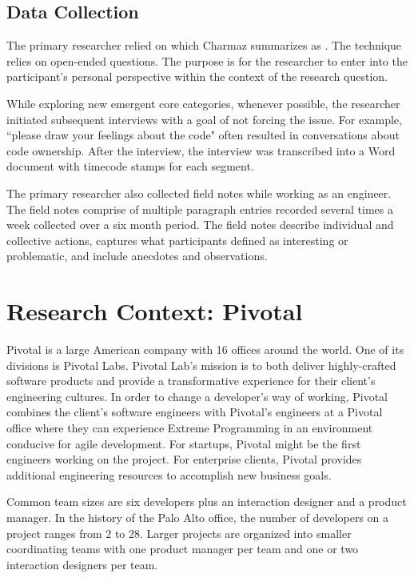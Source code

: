 \subsection{Data Collection}
The primary researcher relied on  which Charmaz summarizes as  \cite{Charmaz}. The technique relies on open-ended questions. The purpose is for the researcher to enter into the participant's personal perspective within the context of the research question. 

While exploring new emergent core categories, whenever possible, the researcher initiated subsequent interviews with a goal of not forcing the issue. For example, ``please draw your feelings about the code" often resulted in conversations about code ownership. After the interview, the interview was transcribed into a Word document with timecode stamps for each segment.

The primary researcher also collected field notes while working as an engineer. The field notes comprise of multiple paragraph entries recorded several times a week collected over a six month period. The field notes describe individual and collective actions, captures what participants defined as interesting or problematic, and include anecdotes and observations. 

\section{Research Context: Pivotal}
\label{ResearchContext}
Pivotal is a large American company with 16 offices around the world. One of its divisions is Pivotal Labs. Pivotal Lab's mission is to both deliver highly-crafted software products and provide a transformative experience for their client's engineering cultures. In order to change a developer's way of working, Pivotal combines the client's software engineers with Pivotal's engineers at a Pivotal office where they can experience Extreme Programming in an environment conducive for agile development. For startups, Pivotal might be the first engineers working on the project. For enterprise clients, Pivotal provides additional engineering resources to accomplish new business goals. 

Common team sizes are six developers plus an interaction designer and a product manager. In the history of the Palo Alto office, the number of developers on a project ranges from 2 to 28. Larger projects are organized into smaller coordinating teams with one product manager per team and one or two interaction designers per team.

